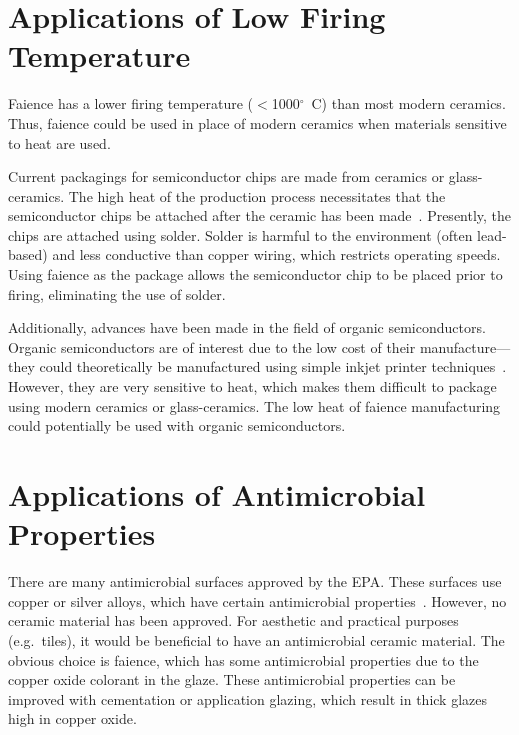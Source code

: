 
\section{Applications of Low Firing Temperature}

Faience has a lower firing temperature ($<$1000$^\circ$~C) than most modern ceramics. Thus, faience could be used in place of modern ceramics when materials sensitive to heat are used.

Current packagings for semiconductor chips are made from ceramics or glass-ceramics. The high heat of the production process necessitates that the semiconductor chips be attached after the ceramic has been made~\cite{tummala91,ivf.se}. Presently, the chips are attached using solder. Solder is harmful to the environment (often lead-based) and less conductive than copper wiring, which restricts operating speeds. Using faience as the package allows the semiconductor chip to be placed prior to firing, eliminating the use of solder.

Additionally, advances have been made in the field of organic semiconductors. Organic semiconductors are of interest due to the low cost of their manufacture---they could theoretically be manufactured using simple inkjet printer techniques~\cite{chiang77}. However, they are very sensitive to heat, which makes them difficult to package using modern ceramics or glass-ceramics. The low heat of faience manufacturing could potentially be used with organic semiconductors.


\section{Applications of Antimicrobial Properties}

There are many antimicrobial surfaces approved by the EPA. These surfaces use copper or silver alloys, which have certain antimicrobial properties~\cite{epa,coppertouch}. However, no ceramic material has been approved. For aesthetic and practical purposes (e.g.\ tiles), it would be beneficial to have an antimicrobial ceramic material. The obvious choice is faience, which has some antimicrobial properties due to the copper oxide colorant in the glaze. These antimicrobial properties can be improved with cementation or application glazing, which result in thick glazes high in copper oxide.


